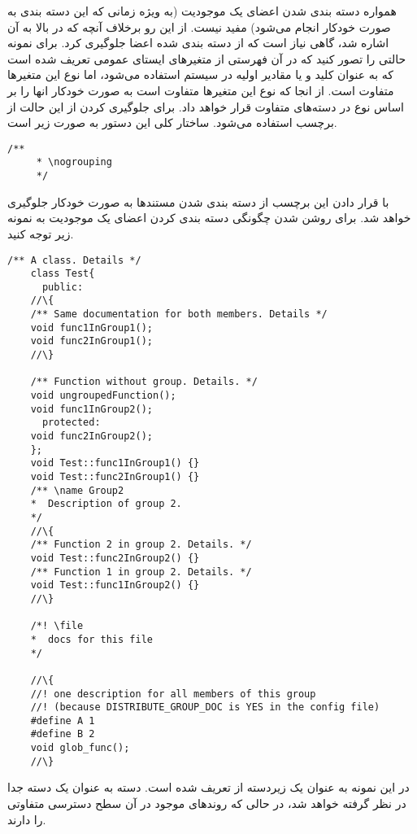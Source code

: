 همواره دسته بندی شدن اعضای یک موجودیت (به ویژه زمانی که این دسته بندی به صورت
خودکار انجام می‌شود) مفید نیست. از این رو برخلاف آنچه که در بالا به آن اشاره شد،
گاهی نیاز است که از دسته بندی شده اعضا جلوگیری کرد. برای نمونه حالتی را تصور
کنید که در آن فهرستی از متغیرهای ایستای عمومی تعریف شده است که
به عنوان کلید و یا مقادیر اولیه در سیستم استفاده می‌شود، اما نوع این متغیرها
متفاوت است. از انجا که نوع این متغیرها متفاوت است  به صورت خودکار
انها را بر اساس نوع در دسته‌های متفاوت قرار خواهد داد. برای جلوگیری کردن از این
حالت از برچسب  استفاده می‌شود. ساختار کلی این دستور به صورت زیر
است.

\begin{latin}
\lstset{language=C++}  
\begin{lstlisting}[frame=single] 
    /**
     * \nogrouping
     */
\end{lstlisting}
\end{latin}

با قرار دادن این برچسب از دسته بندی شدن مستندها به صورت خودکار جلوگیری خواهد شد.
برای روشن شدن چگونگی دسته بندی کردن اعضای یک موجودیت به نمونه زیر توجه کنید.

\begin{latin}
\lstset{language=C++}  
\begin{lstlisting}[frame=single] 
    /** A class. Details */
    class Test{
      public:
	//\{
	/** Same documentation for both members. Details */
	void func1InGroup1();
	void func2InGroup1();
	//\}

	/** Function without group. Details. */
	void ungroupedFunction();
	void func1InGroup2();
      protected:
	void func2InGroup2();
    };
    void Test::func1InGroup1() {}
    void Test::func2InGroup1() {}
    /** \name Group2
    *  Description of group 2. 
    */
    //\{
    /** Function 2 in group 2. Details. */
    void Test::func2InGroup2() {}
    /** Function 1 in group 2. Details. */
    void Test::func1InGroup2() {}
    //\}

    /*! \file 
    *  docs for this file
    */

    //\{
    //! one description for all members of this group 
    //! (because DISTRIBUTE_GROUP_DOC is YES in the config file)
    #define A 1
    #define B 2
    void glob_func();
    //\}
\end{lstlisting}
\end{latin}
در این نمونه  به عنوان یک زیردسته از  تعریف شده است. دسته  
به عنوان یک دسته جدا در نظر گرفته خواهد شد، در حالی که روندهای موجود در آن سطح دسترسی متفاوتی را دارند.
